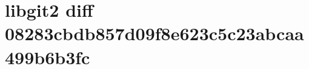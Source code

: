 \documentclass[a4paper]{article}
\begin{document}
\section{libgit2 diff 08283cbdb857d09f8e623c5c23abcaa499b6b3fc}


\end{document}
